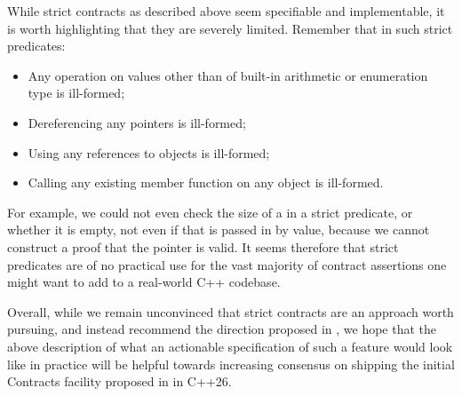 While strict contracts as described above seem specifiable and implementable, it is worth highlighting that they are severely limited. Remember that in such strict predicates:
\begin{itemize}
\item Any operation on values other than of built-in arithmetic or enumeration type is ill-formed;
\item Dereferencing any pointers is ill-formed;
\item Using any references to objects is ill-formed;
\item Calling any existing member function on any object is ill-formed.
\end{itemize}
For example, we could not even check the size of a  in a strict predicate, or whether it is empty, not even if that  is passed in by value, because we cannot construct a proof that the  pointer is valid. It seems therefore that strict predicates are of no practical use for the vast majority of contract assertions one might want to add to a real-world C++ codebase.

Overall, while we remain unconvinced that strict contracts are an approach worth pursuing, and instead recommend the direction proposed in \cite{P3100R1}, we hope that the above description of what an actionable specification of such a feature would look like in practice will be helpful towards increasing consensus on shipping the initial Contracts facility proposed in \cite{P2900R13} in C++26.




\renewcommand{\addcontentsline}[3]{}%







